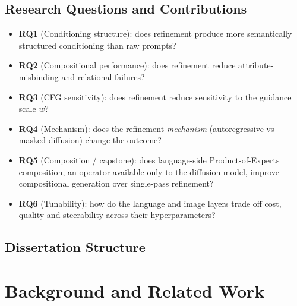 \documentclass[a4paper,twoside,12pt]{report}
\begin{document}
\section{Research Questions and Contributions}
\begin{itemize}
  \item \textbf{RQ1} (Conditioning structure): does refinement produce more
        semantically structured conditioning than raw prompts?
  \item \textbf{RQ2} (Compositional performance): does refinement reduce
        attribute-misbinding and relational failures?
  \item \textbf{RQ3} (CFG sensitivity): does refinement reduce sensitivity to
        the guidance scale $w$?
  \item \textbf{RQ4} (Mechanism): does the refinement \emph{mechanism}
        (autoregressive vs masked-diffusion) change the outcome?
  \item \textbf{RQ5} (Composition / capstone): does language-side
        Product-of-Experts composition, an operator available only to the
        diffusion model, improve compositional generation over single-pass
        refinement?
  \item \textbf{RQ6} (Tunability): how do the language and image layers trade
        off cost, quality and steerability across their hyperparameters?
\end{itemize}

\section{Dissertation Structure}

\chapter{Background and Related Work}
\label{ch:background}
\end{document}
